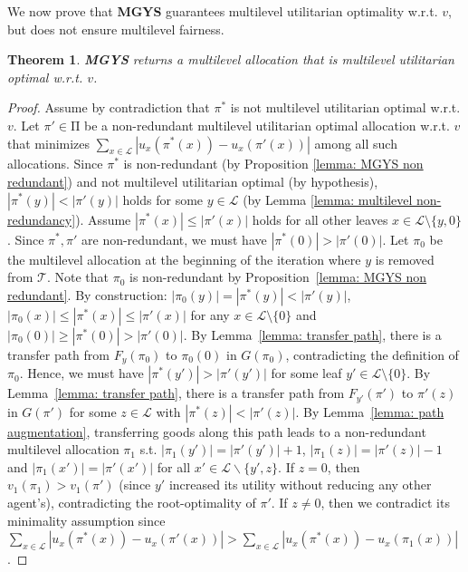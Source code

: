 \documentclass[]{article}
\newtheorem{theorem}{Theorem}
\newcommand{\tree}{\mathcal{T}}
\newcommand{\leaves}{\mathcal{L}}
\newcommand{\mallocations}{\mathrm{\Pi}}
\begin{document}
We now prove that \textbf{MGYS} guarantees multilevel utilitarian optimality w.r.t. $v$, but does not ensure multilevel fairness.

\begin{theorem}
    {\bf MGYS} returns a multilevel allocation that is multilevel utilitarian optimal w.r.t. $v$.
\end{theorem}

\begin{proof}
    Assume by contradiction that $\pi^*$ is not multilevel utilitarian optimal w.r.t. $v$. Let $\pi' \in \mallocations$ be a non-redundant multilevel utilitarian optimal allocation w.r.t. $v$ that minimizes $\sum_{x \in \leaves} |u_x(\pi^*(x)) - u_x(\pi'(x))|$ among all such allocations. Since $\pi^*$ is non-redundant (by Proposition \ref{lemma: MGYS non redundant}) and not multilevel utilitarian optimal (by hypothesis), $|\pi^*(y)| < |\pi'(y)|$ holds for some $y \in \leaves$ (by Lemma \ref{lemma: multilevel non-redundancy}). Assume $|\pi^*(x)|  \leq   |\pi'(x)|$ holds for all other leaves $x \in \leaves \setminus \{y,0\}$. Since $\pi^*, \pi'$ are non-redundant, we must have $|\pi^*(0)| > |\pi'(0)|$. Let $\pi_0$ be the multilevel allocation at the beginning of the iteration where $y$ is removed from $\tree$. Note that $\pi_0$ is non-redundant by Proposition~\ref{lemma: MGYS non redundant}. By construction: $|\pi_0(y)| = |\pi^*(y)| < |\pi'(y)|$, $|\pi_0(x)| \leq |\pi^*(x)| \leq |\pi'(x)|$ for any $x \in \leaves \setminus \{0\}$ and $|\pi_0(0)| \geq |\pi^*(0)| > |\pi'(0)|$. By Lemma~\ref{lemma: transfer path}, there is a transfer path from $F_y(\pi_0)$ to $\pi_0(0)$ in $G(\pi_0)$, contradicting the definition of $\pi_0$.     Hence, we must have $|\pi^*(y')| > |\pi'(y')|$ for some leaf $y' \in  \leaves \setminus \{0\}$. By Lemma~\ref{lemma: transfer path}, there is a transfer path from $F_{y'}(\pi')$ to $\pi'(z)$ in $G(\pi')$ for some $z \in \leaves$ with $|\pi^*(z)| < |\pi'(z)|$. By Lemma~\ref{lemma: path augmentation}, transferring goods along this path leads to a non-redundant multilevel allocation $\pi_1$ s.t. $|\pi_1(y')| = |\pi'(y')| + 1$, $|\pi_1(z)| = |\pi'(z)| - 1$ and $|\pi_1(x')| = |\pi'(x')|$ for all $x'  \in  \leaves \backslash \{y',z\}$. If $z  =  0$, then $v_{1}(\pi_1) > v_{1}(\pi')$ (since $y'$ increased its utility without reducing any other agent’s), contradicting the root-optimality of $\pi'$. If $z \neq 0$, then we contradict its minimality assumption since $\sum_{x \in \leaves} |u_x(\pi^*(x)) - u_x(\pi'(x))| > \sum_{x \in \leaves} |u_x(\pi^*(x)) - u_x(\pi_1(x))|$.
\end{proof}
\end{document}
